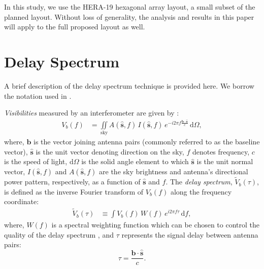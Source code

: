 \documentclass[preprint2,iop,numberedappendix,twocolappendix,appendixfloats]{emulateapj}
\newcommand{\dif}{\mathrm{d}}
\begin{document}
In this study, we use the HERA-19 hexagonal array layout, a small subset of the planned layout. Without loss of generality, the analysis and results in this paper will apply to the full proposed layout as well.

\section{Delay Spectrum}\label{sec:delay-spectrum}

A brief description of the delay spectrum technique \citep{par12a,par12b} is provided here. We borrow the notation used in \citet{thy15a}. 

{\it Visibilities} measured by an interferometer are given by \citep{van34,zer38,tho01}:
\begin{align}\label{eqn:obsvis}
  V_b(f) &= \iint\limits_\textrm{sky} A(\hat{\boldsymbol{s}},f)\,I(\hat{\boldsymbol{s}},f)\,e^{-i2\pi f\frac{\boldsymbol{b}\cdot\hat{\boldsymbol{s}}}{c}}\,\dif\Omega,
\end{align}
where, $\boldsymbol{b}$ is the vector joining antenna pairs (commonly referred to as the baseline vector), $\hat{\boldsymbol{s}}$ is the unit vector denoting direction on the sky, $f$ denotes frequency, $c$ is the speed of light, $\dif\Omega$ is the solid angle element to which $\hat{\boldsymbol{s}}$ is the unit normal vector, $I(\hat{\boldsymbol{s}},f)$ and $A(\hat{\boldsymbol{s}},f)$ are the sky brightness and antenna's directional power pattern, respectively, as a function of $\hat{\boldsymbol{s}}$ and $f$. The {\it delay spectrum}, $\tilde{V}_b(\tau)$, is defined as the inverse Fourier transform of $V_b(f)$ along the frequency coordinate:
\begin{align}\label{eqn:delay-transform}
  \tilde{V}_b(\tau) &\equiv \int V_b(f)\,W(f)\,e^{i2\pi f\tau}\,\dif f,
\end{align}
where, $W(f)$ is a spectral weighting function which can be chosen to control the quality of the delay spectrum \citep{ved12,thy13}, and $\tau$ represents the signal delay between antenna pairs:
\begin{equation}\label{eqn:delay}
  \tau = \frac{\boldsymbol{b}\cdot\hat{\boldsymbol{s}}}{c}.
\end{equation}
\end{document}
